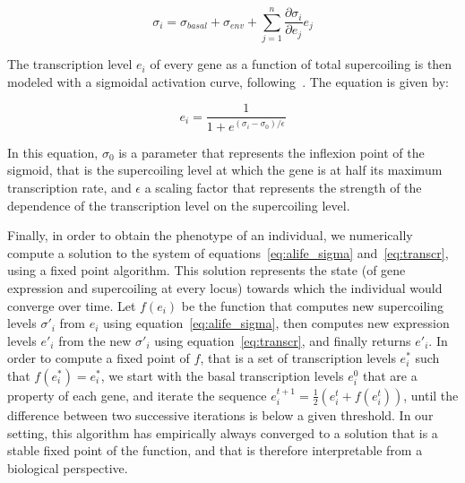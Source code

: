 \begin{equation}
  \sigma_i = \sigma_{basal} + \sigma_{env} + \sum_{j=1}^n\frac{\partial\sigma_{i}}{\partial e_j}e_j
  \label{eq:alife_sigma}
\end{equation}

The transcription level $e_i$ of every gene as a function of total supercoiling is then modeled with a sigmoidal activation curve, following~\cite{elhoudaigui2019}.
The equation is given by:

\begin{equation}
  e_i = \frac{1}{1 + e^{(\sigma_i - \sigma_0)/\epsilon}}
  \label{eq:transcr}
\end{equation}

In this equation, $\sigma_0$ is a parameter that represents the inflexion point of the sigmoid, that is the supercoiling level at which the gene is at half its maximum transcription rate, and $\epsilon$ a scaling factor that represents the strength of the dependence of the transcription level on the supercoiling level.

Finally, in order to obtain the phenotype of an individual, we numerically compute a solution to the system of equations~\ref{eq:alife_sigma} and~\ref{eq:transcr}, using a fixed point algorithm.
This solution represents the state (of gene expression and supercoiling at every locus) towards which the individual would converge over time.
Let $f(e_i)$ be the function that computes new supercoiling levels $\sigma'_i$ from $e_i$ using equation~\ref{eq:alife_sigma}, then computes new expression levels $e'_i$ from the new $\sigma'_i$ using equation~\ref{eq:transcr}, and finally returns $e'_i$.
In order to compute a fixed point of $f$, that is a set of transcription levels $e_i^*$ such that $f(e_i^*) = e_i^*$, we start with the basal transcription levels $e_i^0$ that are a property of each gene, and iterate the sequence $e_i^{t+1} = \frac{1}{2}(e_i^t + f(e_i^t))$, until the difference between two successive iterations is below a given threshold.
In our setting, this algorithm has empirically always converged to a solution that is a stable fixed point of the function, and that is therefore interpretable from a biological perspective.

